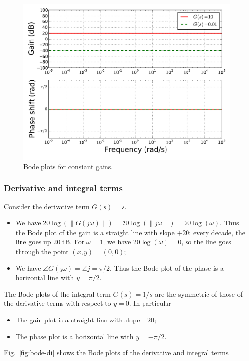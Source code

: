 \documentclass[a4paper,11pt]{report}
\theoremstyle{definition}
\begin{document}
\begin{figure}[H]
  \centering
  \includegraphics[width=12cm]{fig/bode-const.pdf}
  \caption{Bode plots for constant gains.}
  \label{fig:bode-const}
\end{figure}

\subsubsection{Derivative and integral terms}

Consider the derivative term $G(s)=s$. 
\begin{itemize}
\item We have
  $20\log(\|G(j\omega)\|)=20\log(\|j\omega\|)=20\log(\omega)$. Thus
  the Bode plot of the gain is a straight line with slope $+20$: every
  decade, the line goes up 20\,dB. For $\omega=1$, we have
  $20\log(\omega)=0$, so the line goes through the point
  $(x,y)=(0,0)$;
\item We have $\angle G(j\omega)=\angle j=\pi/2$. Thus the Bode plot
  of the phase is a horizontal line with $y=\pi/2$.
\end{itemize}

The Bode plots of the integral term $G(s)=1/s$ are the symmetric of
those of the derivative terms with respect to $y=0$. In particular
\begin{itemize}
\item The gain plot is a straight line with slope $-20$;
\item The phase plot is a horizontal line with $y=-\pi/2$.
\end{itemize}

Fig.~\ref{fig:bode-di} shows the Bode plots of the derivative and
integral terms.
\end{document}
